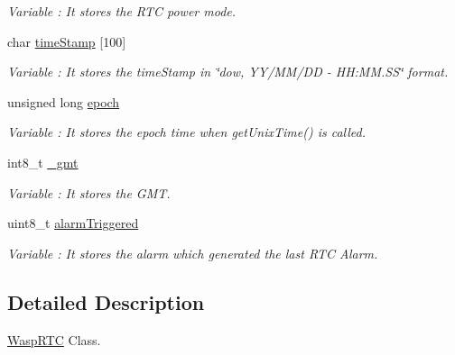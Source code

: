\begin{DoxyCompactItemize}
\begin{DoxyCompactList}\small\item\em Variable \+: It stores the R\+TC power mode. \end{DoxyCompactList}\item 
char \hyperlink{class_wasp_r_t_c_a08437e3f2d8f8bcedef5ff0e31723d3d}{time\+Stamp} \mbox{[}100\mbox{]}\hypertarget{class_wasp_r_t_c_a08437e3f2d8f8bcedef5ff0e31723d3d}{}\label{class_wasp_r_t_c_a08437e3f2d8f8bcedef5ff0e31723d3d}

\begin{DoxyCompactList}\small\item\em Variable \+: It stores the time\+Stamp in \char`\"{}dow, Y\+Y/\+M\+M/\+D\+D -\/ H\+H\+:\+M\+M.\+S\+S\char`\"{} format. \end{DoxyCompactList}\item 
unsigned long \hyperlink{class_wasp_r_t_c_ac4149b615766377a1f3c5bb907c3c98b}{epoch}\hypertarget{class_wasp_r_t_c_ac4149b615766377a1f3c5bb907c3c98b}{}\label{class_wasp_r_t_c_ac4149b615766377a1f3c5bb907c3c98b}

\begin{DoxyCompactList}\small\item\em Variable \+: It stores the epoch time when get\+Unix\+Time() is called. \end{DoxyCompactList}\item 
int8\+\_\+t \hyperlink{class_wasp_r_t_c_a84e28473f406df472c2516882ddbcf22}{\+\_\+gmt}\hypertarget{class_wasp_r_t_c_a84e28473f406df472c2516882ddbcf22}{}\label{class_wasp_r_t_c_a84e28473f406df472c2516882ddbcf22}

\begin{DoxyCompactList}\small\item\em Variable \+: It stores the G\+MT. \end{DoxyCompactList}\item 
uint8\+\_\+t \hyperlink{class_wasp_r_t_c_aeb275f3335c51a0e14ac93ed591f01c1}{alarm\+Triggered}
\begin{DoxyCompactList}\small\item\em Variable \+: It stores the alarm which generated the last R\+TC Alarm. \end{DoxyCompactList}\end{DoxyCompactItemize}


\subsection{Detailed Description}
\hyperlink{class_wasp_r_t_c}{Wasp\+R\+TC} Class. 

